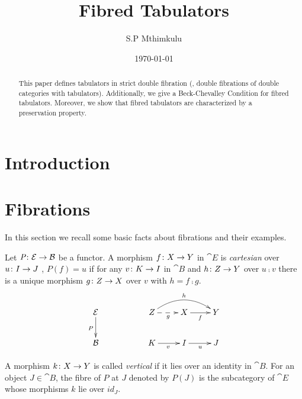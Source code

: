 \documentclass[9pt, leqno]{amsart}
\begin{document}
	\title{Fibred Tabulators} %
	\author[S.P Mthimkulu]{S.P Mthimkulu}
	\date{\today}
	\address{5 Melrose Road, Muizenberg, Cape Town, South Africa}
	\maketitle
	

\begin{abstract}
	
	This paper defines tabulators in strict double fibration (\ie, double fibrations of double categories with tabulators). Additionally, we give a Beck-Chevalley Condition for fibred tabulators. Moreover, we show that  fibred tabulators are characterized by a preservation property.
\end{abstract}
	
\let\thefootnote\relax
{} %

\bigskip

\section*{Introduction}
\lipsum[2][1-4]

\section{Fibrations}

In this section we recall some basic facts about fibrations and their examples.

\begin{defn}
	Let $\operatorname{\textit{P} \colon \mathcal{E} \rightarrow \mathcal{B}}$ be a functor. A morphism $f \colon X \rightarrow Y$ in $\cat{E}$ is \emph{cartesian} over $u \colon I \rightarrow J$ \ie, $P(f) = u$ if for any $v \colon K \rightarrow I$ in $\cat{B}$ and $h \colon Z \rightarrow Y$ over $u \comp v$ there is a unique morphism $g \colon Z \rightarrow X$ over $v$ with $h = f \comp g$.
	\begin{equation*}
		\xymatrix{
			\cat{E} \ar[d]_{P} && Z \ar@{-->}[r]_{g} \ar@/^1.3pc/[rr]^{h} & X \ar[r]_{f} & Y\\
			\cat{B} && K \ar[r]_{v} & I \ar[r]_{u} & J
		}
	\end{equation*}
	
	A morphism $k \colon X \rightarrow Y$ is called \emph{vertical} if it lies over an identity in $\cat{B}$. For an object $J \in \cat{B}$, the fibre of $P$ at $J$ denoted by $P(J)$ is the subcategory of $\cat{E}$ whose morphisms $k$ lie over $id_J$.
\end{defn}
\end{document}
